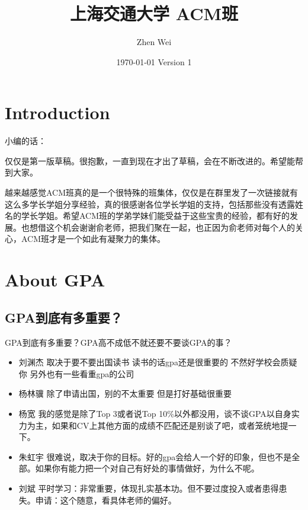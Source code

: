 \documentclass{vivid_layout}
\title{上海交通大学 ACM班}{\fontsize{37.5pt}{15pt}\selectfont 学长去哪儿}
\date{\color{white} \today{} \textbullet{} Version 1}
\author{Zhen Wei}{}
\begin{document}
\maketitle		%



\tableofcontents	%


\section{Introduction}
\addtocounter{section}{1}

小编的话：

仅仅是第一版草稿。很抱歉，一直到现在才出了草稿，会在不断改进的。希望能帮到大家。

越来越感觉ACM班真的是一个很特殊的班集体，仅仅是在群里发了一次链接就有这么多学长学姐分享经验，真的很感谢各位学长学姐的支持，包括那些没有透露姓名的学长学姐。希望ACM班的学弟学妹们能受益于这些宝贵的经验，都有好的发展。也想借这个机会谢谢俞老师，把我们聚在一起，也正因为俞老师对每个人的关心，ACM班才是一个如此有凝聚力的集体。


\section{About GPA}
\addtocounter{section}{1}
\setcounter{subsection}{0}

\subsection{GPA到底有多重要？}
GPA到底有多重要？GPA高不成低不就还要不要谈GPA的事？

\begin{itemize}
\item  { 刘渊杰}  \quad 取决于要不要出国读书 读书的话gpa还是很重要的 不然好学校会质疑你 另外也有一些看重gpa的公司
\item  { 杨林骥}  \quad 除了申请出国，别的不太重要 但是打好基础很重要
\item  { 杨宽}  \quad 我的感觉是除了Top 3或者说Top 10\%以外都没用，谈不谈GPA以自身实力为主，如果和CV上其他方面的成绩不匹配还是别谈了吧，或者笼统地提一下。
\item  { 朱虹宇}  \quad 很难说，取决于你的目标。好的gpa会给人一个好的印象，但也不是全部。如果你有能力把一个对自己有好处的事情做好，为什么不呢。 
\item  { 刘斌}  \quad 平时学习：非常重要，体现扎实基本功。但不要过度投入或者患得患失。申请：这个随意，看具体老师的偏好。
\end{itemize}
\end{document}
